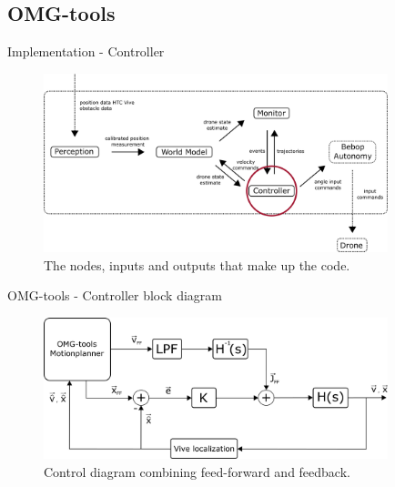 \subsection{OMG-tools}
\label{subsec:Omg}

\begin{frame}{Implementation - Controller}

    \begin{figure}[h]
    \centering
    \includegraphics[width=10cm]{Figures/code_structure_controller.png}
    \caption{The nodes, inputs and outputs that make up the code.}
    \label{fig:code_struct}
    \end{figure}
    		
\end{frame}

\begin{frame}{OMG-tools - Controller block diagram}

    \begin{figure}[h]
    \centering
    \includegraphics[width=10cm]{Figures/control_diagram.png}
    \caption{Control diagram combining feed-forward and feedback.}
    \label{fig:ctrl_diag}
    \end{figure}
    
\end{frame}